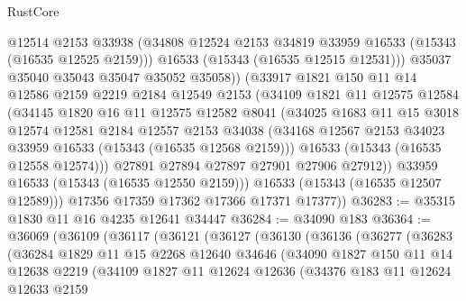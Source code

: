 \begin{lexlean}{RustCore}
\begin{coremodule}
                @12514
                @2153
                @33938
                (@34808 @12524 @2153 @34819 @33959 @16533 (@15343 (@16535 @12525 @2159)))
                @16533
                (@15343 (@16535 @12515 @12531)))
              @35037
              @35040
              @35043
              @35047
              @35052
              @35058))
          (@33917
            @1821
            @150
            @11
            @14
            @12586
            @2159
            @2219
            @2184
            @12549
            @2153
            (@34109
              @1821
              @11
              @12575
              @12584
              (@34145
                @1820
                @16
                @11
                @12575
                @12582
                @8041
                (@34025
                  @1683
                  @11
                  @15
                  @3018
                  @12574
                  @12581
                  @2184
                  @12557
                  @2153
                  @34038
                  (@34168 @12567 @2153 @34023 @33959 @16533 (@15343 (@16535 @12568 @2159)))
                  @16533
                  (@15343 (@16535 @12558 @12574)))
                @27891
                @27894
                @27897
                @27901
                @27906
                @27912))
            @33959
            @16533
            (@15343 (@16535 @12550 @2159)))
          @16533
          (@15343 (@16535 @12507 @12589)))
        @17356
        @17359
        @17362
        @17366
        @17371
        @17377))
@36283 := @35315 @1830 @11 @16 @4235 @12641 @34447
@36284 := @34090 @183
@36364 := @36069
    (@36109
      (@36117
        (@36121
          (@36127
            (@36130
              (@36136
                (@36277
                  (@36283
                    (@36284
                      @1829
                      @11
                      @15
                      @2268
                      @12640
                      @34646
                      (@34090
                        @1827
                        @150
                        @11
                        @14
                        @12638
                        @2219
                        (@34109
                          @1827
                          @11
                          @12624
                          @12636
                          (@34376
                            @183
                            @11
                            @12624
                            @12633
                            @2159

\end{coremodule}
\end{lexlean}
